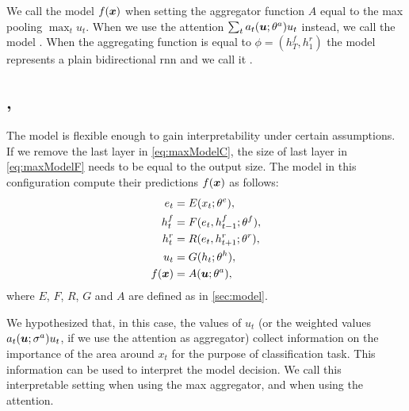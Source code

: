 We call \maxp{} the model $f(\bm{x})$ when setting the aggregator
function $A$ equal to the max pooling $\max_t u_t$. When we use
the attention $\sum_t a_t(\bm{u};\theta^a) u_t$ instead, we call the
model \softmax{}. When the aggregating function is equal to
$\phi=(h^f_T,h^r_1)$ the model represents a plain bidirectional
\ac{rnn} and we call it \gru{}.

\subsection{\maxi, \softmaxi}
The model is flexible enough to gain interpretability under certain
assumptions. If we remove the last layer in \eqref{eq:maxModelC},
the size of last layer in \eqref{eq:maxModelF}
needs to be equal to the
output size.
The model in this configuration compute their predictions
$f(\bm{x})$ as follows:
\begin{align}
  e_t &= E(x_t;\theta^e),\\
  h^f_t &= F(e_t,h^f_{t-1};\theta^f),\\
  h^r_t &= R(e_t,h^r_{t+1};\theta^r),\\
  u_t &= G(h_t;\theta^h),\\
  f(\bm{x}) &= A(\bm{u};\theta^a),
\end{align}
where $E$, $F$, $R$, $G$ and $A$ are defined as in \cref{sec:model}.

We hypothesized that, in this case, the values of
$u_t$ (or the weighted values $a_t(\bm{u};\sigma^a)u_t$, if we use the
attention as aggregator) collect information on the importance of the
area 
around $x_t$ for the purpose of classification task. This
information can be
used to interpret the model decision. We call \maxi{} this
interpretable setting when using the max aggregator, and \softmaxi{}
when using the attention.
